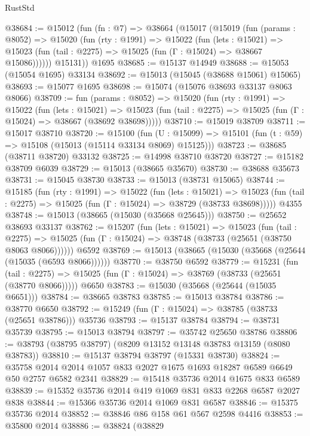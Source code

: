 \begin{lexlean}{RustStd}
\begin{coremodule}
@38684 := @15012
    (fun (fn : @7) =>
    @38664
      (@15017
        (@15019
          (fun (params : @8052) =>
          @15020
            (fun (rty : @1991) =>
            @15022
              (fun (lets : @15021) =>
              @15023 (fun (tail : @2275) => @15025 (fun (Γ : @15024) => @38667 @15086))))))
        @15131))
    @1695
@38685 := @15137 @14949
@38688 := @15053 (@15054 @1695) @33134
@38692 := @15013 (@15045 (@38688 @15061) @15065)
@38693 := @15077 @1695
@38698 := @15074 (@15076 @38693 @33137 @8063 @8066)
@38709 := fun (params : @8052) =>
  @15020
    (fun (rty : @1991) =>
    @15022
      (fun (lets : @15021) =>
      @15023 (fun (tail : @2275) => @15025 (fun (Γ : @15024) => @38667 (@38692 @38698)))))
@38710 := @15019 @38709
@38711 := @15017 @38710
@38720 := @15100
    (fun (U : @15099) => @15101 (fun (t : @59) => @15108 (@15013 (@15114 @33134 @8069) @15125)))
@38723 := @38685 (@38711 @38720) @33132
@38725 := @14998 @38710 @38720
@38727 := @15182 @38709 @6039
@38729 := @15013 (@38665 @35670)
@38730 := @38688 @35673
@38731 := @15045 @38730
@38733 := @15013 (@38731 @15065)
@38744 := @15185
    (fun (rty : @1991) =>
    @15022
      (fun (lets : @15021) =>
      @15023 (fun (tail : @2275) => @15025 (fun (Γ : @15024) => @38729 (@38733 @38698)))))
    @4355
@38748 := @15013 (@38665 (@15030 (@35668 @25645)))
@38750 := @25652 @38693 @33137
@38762 := @15207
    (fun (lets : @15021) =>
    @15023
      (fun (tail : @2275) =>
      @15025 (fun (Γ : @15024) => @38748 (@38733 (@25651 (@38750 @8063 @8066))))))
    @6592
@38769 := @15013 (@38665 (@15030 (@35668 (@25644 (@15035 (@6593 @8066))))))
@38770 := @38750 @6592
@38779 := @15231
    (fun (tail : @2275) => @15025 (fun (Γ : @15024) => @38769 (@38733 (@25651 (@38770 @8066)))))
    @6650
@38783 := @15030 (@35668 (@25644 (@15035 @6651)))
@38784 := @38665 @38783
@38785 := @15013 @38784
@38786 := @38770 @6650
@38792 := @15249 (fun (Γ : @15024) => @38785 (@38733 (@25651 @38786))) @35736
@38793 := @15137 @38784
@38794 := @38731 @35739
@38795 := @15013 @38794
@38797 := @35742 @25650 @38786
@38806 := @38793 (@38795 @38797) (@8209 @13152 @13148 @38783 @13159 (@8080 @38783))
@38810 := @15137 @38794 @38797 (@15331 @38730)
@38824 := @35758 @2014 @2014 @1057 @833 @2027 @1675 @1693 @18287 @6589 @6649 @50 @2757 @6582 @2341
@38829 := @15418 @35736 @2014 @1675 @833 @6589
@38839 := @15352 @35736 @2014 @419 @1069 @831 @833 @2268 @6587 @2027 @838
@38844 := @15366 @35736 @2014 @1069 @831 @6587
@38846 := @15375 @35736 @2014
@38852 := @38846 @86 @158 @61 @567 @2598 @4416
@38853 := @35800 @2014
@38886 := @38824
    (@38829

\end{coremodule}
\end{lexlean}

